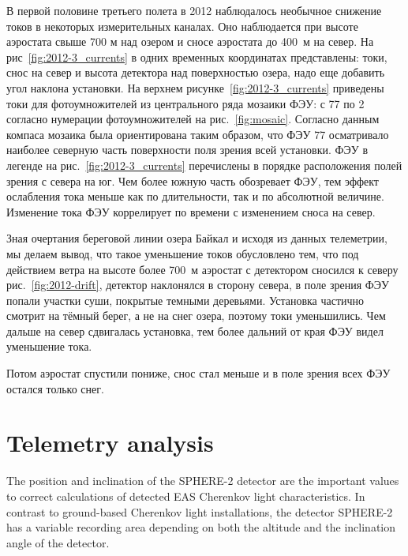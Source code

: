 \documentclass[final,5p,times,twocolumn]{elsarticle}
\begin{document}
{\Russian

В первой половине третьего полета в 2012 наблюдалось необычное снижение токов в некоторых измерительных каналах. Оно наблюдается при высоте аэростата свыше 700 м над озером и сносе аэростата до 400~м на север. На рис~\ref{fig:2012-3_currents} в одних временных координатах представлены: токи, снос на север и высота детектора над поверхностью озера, надо еще добавить угол наклона установки. На верхнем рисунке~\ref{fig:2012-3_currents} приведены токи для фотоумножителей из центрального ряда мозаики ФЭУ: с 77 по 2 согласно нумерации фотоумножителей на рис.~\ref{fig:mosaic}. Согласно данным компаса мозаика была ориентирована таким образом, что ФЭУ 77 осматривало наиболее северную часть поверхности поля зрения всей установки. ФЭУ в легенде на рис.~\ref{fig:2012-3_currents} перечислены в порядке расположения полей зрения с севера на юг. Чем более южную часть обозревает ФЭУ, тем эффект ослабления тока меньше как по длительности, так и по абсолютной величине. Изменение тока ФЭУ коррелирует по времени с изменением сноса на север. 

Зная очертания береговой линии озера Байкал и исходя из данных телеметрии, мы делаем вывод, что такое уменьшение токов обусловлено тем, что под действием ветра на высоте более 700~м аэростат с детектором сносился к северу рис.~\ref{fig:2012-drift}, детектор наклонялся в сторону севера, в поле зрения ФЭУ попали участки суши, покрытые темными деревьями. Установка частично смотрит на тёмный берег, а не на снег озера, поэтому токи уменьшились. Чем дальше на север сдвигалась установка, тем более дальний от края ФЭУ видел уменьшение тока.  

Потом аэростат спустили пониже, снос стал меньше и в поле зрения всех ФЭУ остался только снег. 


}



\section{Telemetry analysis}

The position and inclination of the SPHERE-2 detector are the important values to correct calculations of detected EAS Cherenkov light characteristics. In contrast to ground-based Cherenkov light installations, the detector SPHERE-2 has a variable recording area depending on both the altitude and the inclination angle of the detector.
\end{document}
